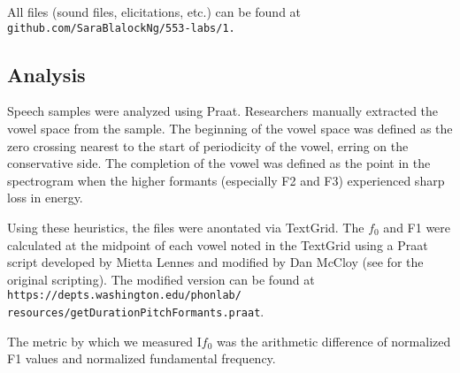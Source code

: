 \documentclass[12pt]{article}
\begin{document}
	All files (sound files, elicitations, etc.) can be found at \texttt{github.com/SaraBlalockNg/553-labs/1.}
	
	\subsection{Analysis}
	
	Speech samples were analyzed using Praat.  Researchers manually extracted the vowel space from the sample.  The beginning of the vowel space was defined as the zero crossing nearest to the start of periodicity of the vowel, erring on the conservative side.  The completion of the vowel was defined as the point in the spectrogram when the higher formants (especially F2 and F3) experienced sharp loss in energy.  
	
	Using these heuristics, the files were anontated via TextGrid.  The $f_0$ and F1 were calculated at the midpoint of each vowel noted in the TextGrid using a Praat script developed by Mietta Lennes and modified by Dan McCloy (see \cite{praat} for the original scripting).  The modified version can be found at \texttt{https://depts.washington.edu/phonlab/ resources/getDurationPitchFormants.praat}.
	
	The metric by which we measured I$f_0$ was the arithmetic difference of normalized F1 values and normalized fundamental frequency.  
	
\end{document}
